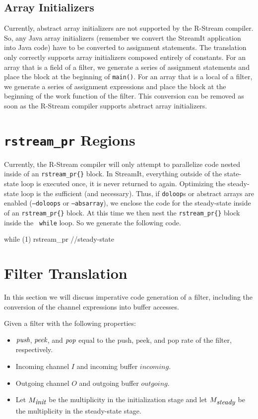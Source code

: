 \documentclass[10pt, letterpaper, onecolumn]{article}
\begin{document}
\subsection{Array Initializers}
Currently, abstract array initializers are not supported by the
R-Stream compiler.  So, any Java array initializers (remember we
convert the StreamIt application into Java code) have to be converted
to assignment statements.  The translation only correctly
supports array initializers composed entirely of constants.  For an
array that is a field of a filter, we generate a series of assignment
statements and place the block at the beginning of {\tt main()}.  For
an array that is a local of a filter, we generate a series of
assignment expressions and place the block at the beginning of the work
function of the filter.  This conversion can be removed as soon as the
R-Stream compiler supports abstract array initializers.

\section{{\tt rstream\_pr} Regions}
Currently, the R-Stream compiler will only attempt to parallelize code
nested inside of an {\tt rstream\_pr\{\}} block.  In StreamIt,
everything outside of the state-state loop is executed once, it is
never returned to again.  Optimizing the steady-state loop is the
sufficient (and necessary).  Thus, if {\tt doloop}s or abstract arrays
are enabled ({\tt --doloops} or {\tt --absarray}), we enclose the
code for the steady-state inside of an {\tt rstream\_pr\{\}} block.  At
this time we then nest the {\tt rstream\_pr\{\}} block inside the {\tt
  while} loop.  So we generate the following code.

\begin{verbatimtab}[4]
while (1) {
  rstream_pr {
    //steady-state
  }
}
\end{verbatimtab}

\section{Filter Translation}
\label{filter}
In this section we will discuss imperative code generation  of a
 filter, including the conversion of the channel expressions into
 buffer accesses.

Given a filter with the following properties:

\begin{itemize}
\item $\mbox{\it push}$, $\mbox{\it peek}$, and $\mbox{\it pop}$ equal to the push,
  peek, and pop rate of the filter, respectively.
\item Incoming channel $I$ and incoming buffer $incoming$.
\item Outgoing channel $O$ and outgoing buffer $outgoing$.
\item Let $M_{\mbox{\it init}}$ be the multiplicity in the initialization
  stage and let $M_{\mbox{\it steady}}$ be the multiplicity in the
  steady-state stage.
\end{itemize}
\end{document}
